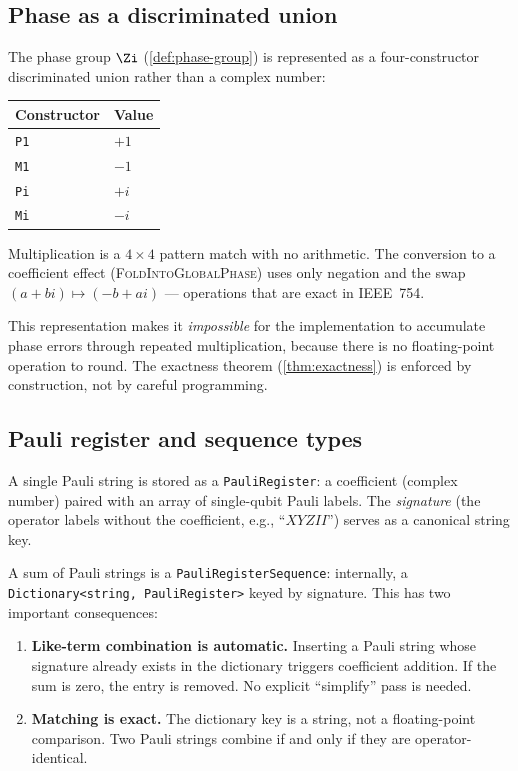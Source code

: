 \subsection*{Phase as a discriminated union}

The phase group $\Zi$ (\cref{def:phase-group}) is represented as a
four-constructor discriminated union rather than a complex number:

\begin{center}
\begin{tabular}{@{}ll@{}}
\toprule
\textbf{Constructor} & \textbf{Value} \\
\midrule
\texttt{P1} & $+1$ \\
\texttt{M1} & $-1$ \\
\texttt{Pi} & $+i$ \\
\texttt{Mi} & $-i$ \\
\bottomrule
\end{tabular}
\end{center}

Multiplication is a $4 \times 4$ pattern match with no arithmetic.
The conversion to a coefficient effect (\textsc{FoldIntoGlobalPhase})
uses only negation and the swap $(a + bi) \mapsto (-b + ai)$ ---
operations that are exact in IEEE~754.

This representation makes it \emph{impossible} for the implementation
to accumulate phase errors through repeated multiplication, because
there is no floating-point operation to round.  The exactness theorem
(\cref{thm:exactness}) is enforced by construction, not by careful
programming.

\subsection*{Pauli register and sequence types}

A single Pauli string is stored as a \texttt{PauliRegister}: a
coefficient (complex number) paired with an array of single-qubit
Pauli labels.  The \emph{signature} (the operator labels without the
coefficient, e.g., ``$XYZII$'') serves as a canonical string key.

A sum of Pauli strings is a \texttt{PauliRegisterSequence}: internally,
a \texttt{Dictionary<string, PauliRegister>} keyed by signature.  This
has two important consequences:

\begin{enumerate}
  \item \textbf{Like-term combination is automatic.}  Inserting a
    Pauli string whose signature already exists in the dictionary
    triggers coefficient addition.  If the sum is zero, the entry is
    removed.  No explicit ``simplify'' pass is needed.
  \item \textbf{Matching is exact.}  The dictionary key is a string,
    not a floating-point comparison.  Two Pauli strings combine if
    and only if they are operator-identical.
\end{enumerate}

